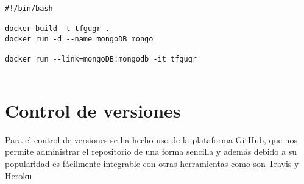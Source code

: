 \begin{lstlisting}
#!/bin/bash

docker build -t tfgugr .
docker run -d --name mongoDB mongo

docker run --link=mongoDB:mongodb -it tfgugr


\end{lstlisting}


\section {Control de versiones}
Para el control de versiones se ha hecho uso de la plataforma GitHub, que nos permite administrar el repositorio de una forma sencilla y además debido a su popularidad es fácilmente integrable con otras herramientas como son Travis y Heroku









